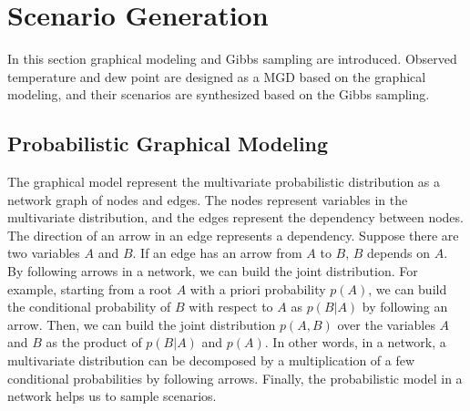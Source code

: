 \documentclass[journal]{IEEEtran} %
\begin{document}
\section{Scenario Generation}

In this section graphical modeling and Gibbs sampling are introduced. Observed temperature and dew point are designed as a MGD based on the graphical modeling, and their scenarios are synthesized based on the Gibbs sampling.















\subsection{Probabilistic Graphical Modeling}

The  graphical model represent the multivariate probabilistic distribution as a network graph of nodes and edges. 
The nodes represent variables in the multivariate distribution, and the edges represent the dependency between nodes. The direction of an arrow in an edge represents a dependency. Suppose there are two variables $A$ and $B$. If an edge has an arrow from $A$ to $B$, $B$ depends on $A$. By following arrows in a network, we can build the joint distribution. For example, starting from a root $A$ with a priori probability $p(A)$, we can build the conditional probability of $B$ with respect to $A$ as $p(B|A)$ by following an arrow. Then, we can build the joint distribution $p(A,B)$ over the variables $A$ and $B$ as the product of $p(B|A)$ and $p(A)$. In other words, in a network, a multivariate distribution can be decomposed by a multiplication of a few conditional probabilities by following arrows. Finally, the probabilistic model in a network helps us to sample scenarios.  
\end{document}
